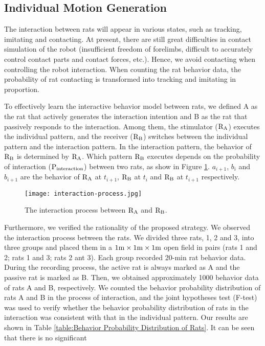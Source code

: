 \subsection{Individual Motion Generation}
The interaction between rats will appear in various states, such as tracking,
imitating and contacting. At present, there are still great difficulties in
contact simulation of the robot (insufficient freedom of forelimbs, difficult to
accurately control contact parts and contact forces, etc.). Hence, we avoid
contacting when controlling the robot interaction. When counting the rat
behavior data, the probability of rat contacting is transformed into tracking
and imitating in proportion.

To effectively learn the interactive behavior model between rats, we defined A
as the rat that actively generates the interaction intention and B as the rat
that passively responds to the interaction. Among them, the stimulator (${\rm
R_A}$) executes the individual pattern, and the receiver (${\rm R_B}$) switches
between the individual pattern and the interaction pattern. In the interaction
pattern, the behavior of ${\rm R_B}$ is determined by ${\rm R_A}$. Which pattern
${\rm R_B}$ executes depends on the probability of interaction ($\rm
P_{interaction}$) between two rats, as show in Figure \ref{interaction-process}.
$a_{i+1}$, $b_i$ and $b_{i+1}$ are the behavior of ${\rm R_A}$ at $t_{i+1}$,
${\rm R_B}$ at $t_i$ and ${\rm R_B}$ at $t_{i+1}$ respectively.
\begin{figure}[h]
    \centering
    \texttt{[image: interaction-process.jpg]}
    \caption{The interaction process between $\rm R_A$ and $\rm R_B$.}
    \label{interaction-process}
\end{figure}
Furthermore, we verified the rationality of the proposed strategy. We observed
the interaction process between the rats. We divided three rats, 1, 2 and 3,
into three groups and placed them in a $1{\rm m}\times 1{\rm m}\times 1{\rm m}$
open field in pairs (rats 1 and 2; rats 1 and 3; rats 2 ant 3). Each group
recorded 20-min rat behavior data. During the recording process, the active rat
is always marked as A and the passive rat is marked as B. Then, we obtained
approximately 1000 behavior data of rats A and B, respectively. We counted the
behavior probability distribution of rats A and B in the process of interaction,
and the joint hypotheses test (F-test) was used to verify whether the behavior
probability distribution of rats in the interaction was consistent with that in
the individual pattern. Our results are shown in Table \ref{table:Behavior
Probability Distribution of Rats}. It can be seen that there is no significant
